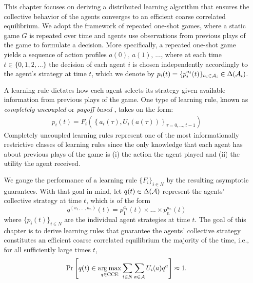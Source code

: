 This chapter focuses on deriving a distributed learning algorithm that ensures the collective behavior of the agents converges to an efficient coarse correlated equilibrium. We adopt the framework of repeated one-shot games, where a static game $G$ is repeated over time and agents use observations from previous plays of the game to formulate a decision.  More specifically, a repeated one-shot game yields  a sequence of action profiles $a(0)$, $a(1)$, $\dots$, where at each time $t \in \{0,1,2, \dots\}$ the decision of each agent $i$ is chosen independently accordingly to the agent's strategy at time $t$, which we denote by $p_i(t) = \{p_i^{a_i}(t)\}_{a_i \in {\cal A}_i} \in \Delta({\cal A}_i)$.  


A learning rule dictates how each agent selects its strategy given available information from previous plays of the game. One type of learning rule, known as {\it completely uncoupled} or {\it payoff based} \cite{Foster2006}, takes on the form:
%
\begin{eqnarray}\label{eq:231}
p_i(t) = F_i\left(\left\{a_i(\tau), U_i(a(\tau))\right\}_{\tau = 0, \dots, t-1} \right)
\end{eqnarray}
%
Completely uncoupled learning rules represent one of the most informationally restrictive classes of learning rules since the only knowledge that each agent has about previous plays of the game is (i) the action the agent played and (ii) the utility the agent received. %

We gauge the performance of a learning rule $\{F_i\}_{i\in N}$ by the resulting asymptotic guarantees.  With that goal in mind, let $q(t) \in \Delta({\cal A})$ represent the agents' collective strategy at time $t$, which is of the form
%
\begin{equation}\label{eq:123}
q^{(a_1, \dots, a_n)}(t) = p_1^{a_1}(t) \times \dots \times p_n^{a_n}(t) 
\end{equation}
%
where $\{p_i(t)\}_{i \in N}$ are the individual agent strategies at time $t$. The goal of this chapter is to derive learning rules that guarantee the agents' collective strategy constitutes an efficient coarse correlated equilibrium the majority of the time, i.e., for all sufficiently large times $t$, 
%
\begin{equation}
{\rm Pr}\left[ q(t) \in \underset{q \in {\rm CCE}}{\arg \max} \sum_{i \in N} \sum_{a \in {\cal A}} U_i(a) q^a \right] \approx 1.  
\end{equation}
%

